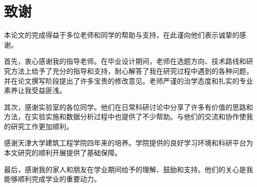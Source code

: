 
\chapter*{致\qquad 谢}
\song{}

本论文的完成得益于多位老师和同学的帮助与支持，在此谨向他们表示诚挚的感谢。

首先，衷心感谢我的指导老师。在毕业设计期间，老师在选题方向、技术路线和研究方法上给予了充分的指导和支持，耐心解答了我在研究过程中遇到的各种问题，并在论文撰写阶段提出了许多宝贵的修改意见。老师严谨的治学态度和扎实的专业素养让我受益匪浅。

其次，感谢实验室的各位同学。他们在日常科研讨论中分享了许多有价值的思路和方法，在实验实施和数据分析过程中也提供了不少帮助。与他们的交流和协作使我的研究工作更加顺利。

感谢天津大学建筑工程学院四年来的培养。学院提供的良好学习环境和科研平台为本文研究的顺利开展提供了基础保障。

最后，感谢我的家人和朋友在学业期间给予的理解、鼓励和支持。他们的关心是我能够顺利完成学业的重要动力。
